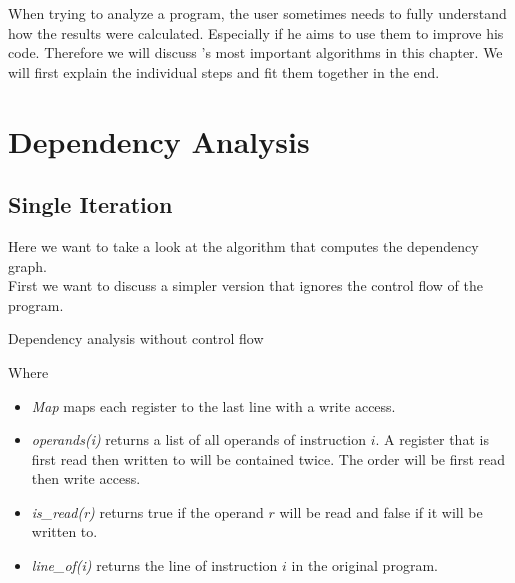 When trying to analyze a program, the user sometimes needs to fully understand how the results were calculated. Especially if he aims to use them to improve his code. Therefore we will discuss \suaca's most important algorithms in this chapter. We will first explain the individual steps and fit them together in the end.

\section{Dependency Analysis}
\label{sec:depanalysis}

\subsection{Single Iteration}

Here we want to take a look at the algorithm that computes the dependency graph. \\
First we want to discuss a simpler version that ignores the control flow of the program.

\begin{algorithm}[H]
    \SetAlgoLined
    \caption{Dependency analysis without control flow}
    \label{alg:depsingle}
\end{algorithm}

\newpage

Where
\begin{itemize}
    \item \emph{Map} maps each register to the last line with a write access.
    \item \emph{operands(i)} returns a list of all operands of instruction $i$. A register that is first read then written to will be contained twice. The order will be first read then write access.
    \item \emph{is\_read(r)} returns true if the operand $r$ will be read and false if it will be written to.
    \item \emph{line\_of(i)} returns the line of instruction $i$ in the original program.
\end{itemize}


